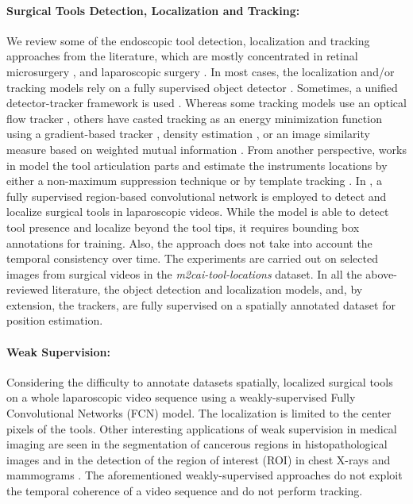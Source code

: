 \documentclass{svjour3}                     \smartqed
\begin{document}
\paragraph{\textbf{Surgical Tools Detection, Localization and Tracking:}}
We review some of the endoscopic tool detection, localization and tracking approaches from the literature, which are mostly concentrated in retinal microsurgery \cite{ipcai:richa2011visual,miccai:sznitman2014fast,miccai:sznitman2011unified,mai:rieke2016real,miccai:sznitman2012data}, and laparoscopic surgery \cite{miccai:sznitman2014fast,miccai:vardazaryan2018weakly,wacv:jin2018tool}. 
In most cases, the localization and/or tracking models rely on a fully supervised object detector \cite{miccai:sznitman2012data,lstm_da:milan2017online,mai:rieke2016real,miccai:sznitman2014fast}. Sometimes, a unified detector-tracker framework is used \cite{miccai:sznitman2011unified}. 
Whereas some tracking models use an optical flow tracker \cite{miccai:lo2003episode}, others have casted tracking as an energy minimization function using a gradient-based tracker \cite{ipcai:richa2011visual,mai:rieke2016real,miccai:sznitman2012data}, density estimation \cite{miccai:sznitman2011unified}, or an image similarity measure based on weighted mutual information \cite{ipcai:richa2011visual}.
From another perspective, works in \cite{miccai:sznitman2014fast,mai:rieke2016real} model the tool articulation parts and estimate the instruments locations by either a non-maximum suppression technique \cite{miccai:sznitman2014fast} or by template tracking \cite{mai:rieke2016real}.
In \cite{wacv:jin2018tool}, a fully supervised region-based convolutional network is employed to detect and localize surgical tools in laparoscopic videos. While the model is able to detect tool presence and localize beyond the tool tips, it requires bounding box annotations for training.
Also, the approach does not take into account the temporal consistency over time. The experiments are carried out on selected images from surgical videos in the \textit{m2cai-tool-locations} dataset.
In all the above-reviewed literature, the object detection and localization models, and, by extension, the trackers, are fully supervised on a spatially annotated dataset for position estimation.

\paragraph{\textbf{Weak Supervision:}}
Considering the difficulty to annotate datasets spatially, \cite{miccai:vardazaryan2018weakly} localized surgical tools on a whole laparoscopic video sequence using a weakly-supervised Fully Convolutional Networks (FCN) model. 
The localization is limited to the center pixels of the tools. 
Other interesting applications of weak supervision in medical imaging are seen in the segmentation of cancerous regions in histopathological images \cite{ieee:jia2017constrained} and in the detection of the region of interest (ROI) in chest X-rays and mammograms \cite{miccai:hwang2016self}.
The aforementioned weakly-supervised approaches do not exploit the temporal coherence of a video sequence and do not perform tracking. 
\end{document}
